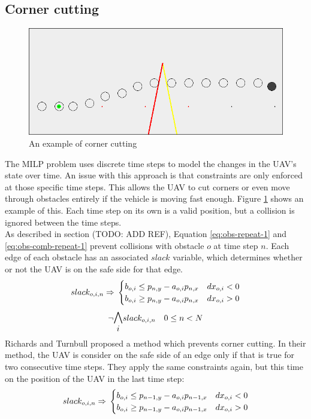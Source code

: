 \subsection{Corner cutting}
\begin{figure}
\includegraphics[width=\textwidth]{img/cornercut_bad}
\caption{An example of corner cutting}
\label{fig:cornercut-example}
\end{figure}
The MILP problem uses discrete time steps to model the changes in the UAV's state over time. An issue with this approach is that constraints are only enforced at those specific time steps. This allows the UAV to cut corners or even move through obstacles entirely if the vehicle is moving fast enough. Figure \ref{fig:cornercut-example} shows an example of this. Each time step on its own is a valid position, but a collision is ignored between the time steps.\\
As described in section (TODO: ADD REF), Equation \ref{eq:obs-repeat-1} and \ref{eq:obs-comb-repeat-1} prevent collisions with obstacle $o$ at time step $n$. Each edge of each obstacle has an associated $slack$ variable, which determines whether or not the UAV is on the safe side for that edge.
\begin{equation}
\label{eq:obs-repeat-1}
slack_{o,i,n} \Rightarrow \\
\begin{cases}
b_{o,i} \leq p_{n,y} - a_{o,i} p_{n,x} & dx_{o,i} < 0 \\
b_{o,i} \geq p_{n,y} - a_{o,i} p_{n,x} & dx_{o,i} > 0 \\
\end{cases}
\end{equation}
\begin{equation}
\label{eq:obs-comb-repeat-1}
\neg \mathlarger{\mathlarger{\bigwedge_{i}}} slack_{o,i,n} \quad 0 \leq n < N
\end{equation}
Richards and Turnbull\cite{Richards2015} proposed a method which prevents corner cutting. In their method, the UAV is consider on the safe side of an edge only if that is true for two consecutive time steps. They apply the same constraints again, but this time on the position of the UAV in the last time step:
\begin{equation}
\label{eq:corner-skip-fixed}
slack_{o,i,n} \Rightarrow \\
\begin{cases}
b_{o,i} \leq p_{n-1,y} - a_{o,i} p_{n-1,x} & dx_{o,i} < 0 \\
b_{o,i} \geq p_{n-1,y} - a_{o,i} p_{n-1,x} & dx_{o,i} > 0 \\
\end{cases}
\end{equation}

